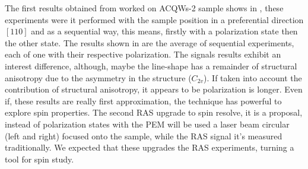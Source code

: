 The first results obtained from worked on \gls{ACQWs}-2 sample shows in , these experiments were it performed with the sample position in a preferential direction $[110]$
and as a sequential way, this means, firstly with a polarization state then the other state.
The results shown in  are the average of sequential experiments, each of one with
their respective polarization. The signals results exhibit an interest difference, although,
maybe the line-shape has a remainder of structural anisotropy due to the asymmetry in
the structure ($C_{2v}$). If taken into account the contribution of structural anisotropy, it appears to be polarization is longer. Even if, these results are really first approximation, the technique has powerful to explore spin properties. The second RAS upgrade to spin resolve, it is a proposal, instead of polarization states with the PEM will be used a laser beam circular (left and right) focused onto the sample, while the RAS signal it’s measured traditionally. We expected that these upgrades the RAS experiments, turning a tool for spin study.




